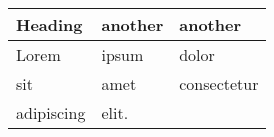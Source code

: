 
\begin{tabular}{lll} \toprule
  Heading & another & another \\
    \midrule
  Lorem & ipsum & dolor \\
  sit & amet & consectetur \\
  adipiscing & elit. \\ \bottomrule
\end{tabular}
